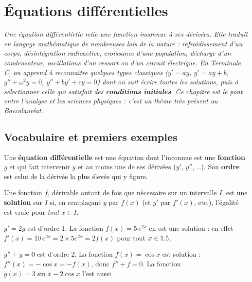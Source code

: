 \chapter{Équations différentielles}

\noindent\textit{Une équation différentielle relie une fonction inconnue à ses
dérivées. Elle traduit en langage mathématique de nombreuses lois de la nature :
refroidissement d'un corps, désintégration radioactive, croissance d'une
population, décharge d'un condensateur, oscillations d'un ressort ou d'un circuit
électrique. En Terminale C, on apprend à reconnaître quelques types classiques
($y'=ay$, $y'=ay+b$, $y''+\omega^2 y=0$, $y''+by'+cy=0$) dont on sait écrire
\emph{toutes} les solutions, puis à sélectionner celle qui satisfait des
\textbf{conditions initiales}. Ce chapitre est le pont entre l'analyse et les
sciences physiques : c'est un thème très présent au Baccalauréat.}
\vspace{8pt}

\section{Vocabulaire et premiers exemples}

\begin{definition}
Une \textbf{équation différentielle} est une équation dont l'inconnue est une
\textbf{fonction} $y$ et qui fait intervenir $y$ et au moins une de ses dérivées
($y'$, $y''$, \dots). Son \textbf{ordre} est celui de la dérivée la plus élevée
qui y figure.

Une fonction $f$, dérivable autant de fois que nécessaire sur un intervalle $I$,
est une \textbf{solution} sur $I$ si, en remplaçant $y$ par $f(x)$ (et $y'$ par
$f'(x)$, etc.), l'égalité est vraie pour \emph{tout} $x\in I$.
\end{definition}

\begin{exemple}
$y'=2y$ est d'ordre $1$. La fonction $f(x)=5\,e^{2x}$ en est une solution : en
effet $f'(x)=10\,e^{2x}=2\times 5e^{2x}=2f(x)$ pour tout $x\in1.5$.
\end{exemple}

\begin{exemple}
$y''+y=0$ est d'ordre $2$. La fonction $f(x)=\cos x$ est solution :
$f''(x)=-\cos x=-f(x)$, donc $f''+f=0$. La fonction $g(x)=3\sin x-2\cos x$ l'est
aussi.
\end{exemple}


